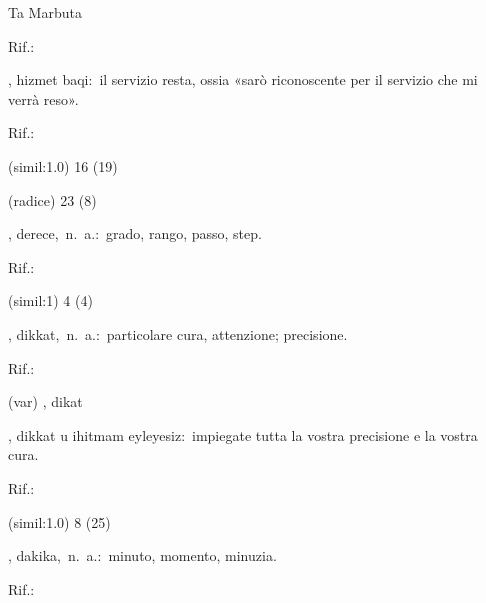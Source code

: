 \begin{glossario}{Ta Marbuta}
\begin{subvocedue}
\begin{subvocedue}
\item[Rif.:] 
\end{subvocedue}
\item[\subglossariobullet] , {\sf hizmet baqi}:\ il servizio resta, ossia «sarò riconoscente per il servizio che mi verrà reso».
\begin{subvocedue}
\item[Rif.:] 
\end{subvocedue}
\item[(simil:1.0)]   16 (19)
\item[(radice)]   23 (8)
\end{subvocedue}
\item[{\color{colorlowref}\spzrl{dara^g:H}},] {\sf derece},\ n.\ a.:\ grado, rango, passo, step.
\begin{subvocedue}
\item[Rif.:] 
\end{subvocedue}
\begin{subvocedue}
\item[(simil:1)]   4 (4)
\end{subvocedue}
\item[{\color{colorlowref}\spzrl{diqqat}},] {\sf dikkat},\ n.\ a.:\ particolare cura, attenzione; precisione.
\begin{subvocedue}
\item[Rif.:] 
\end{subvocedue}
\begin{subvocedue}
\item[(var)] , {\sf dikat}\item[\subglossariobullet] , {\sf dikkat u ihitmam eyleyesiz}:\ impiegate tutta la vostra precisione e la vostra cura.
\begin{subvocedue}
\item[Rif.:] 
\end{subvocedue}
\item[(simil:1.0)]   8 (25)
\end{subvocedue}
\item[{\color{colorlowref}\spzrl{daqIqa_H}},] {\sf dakika},\ n.\ a.:\ minuto, momento, minuzia.
\begin{subvocedue}
\item[Rif.:] 

\end{subvocedue}
\end{glossario}
